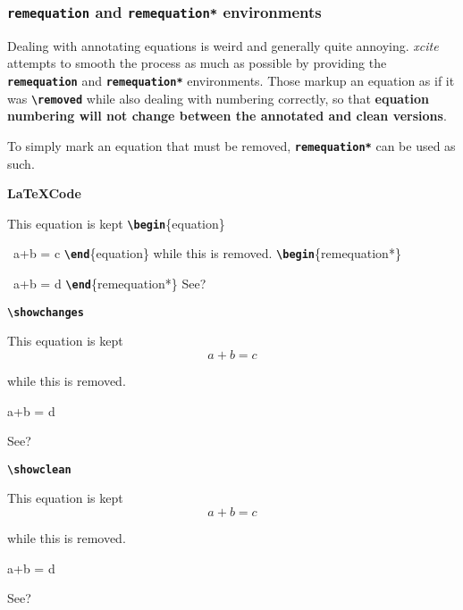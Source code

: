 \documentclass[a4paper]{ltxdoc}
\newcommand{\writecommand}[1]{\texttt{\textbf{{\textbackslash#1}}}}
\newcommand{\writeenv}[1]{\texttt{\textbf{{#1}}}}
\newcommand{\writearg}[1]{\{#1\}}
\begin{document}
\subsubsection{\writeenv{remequation} and \writeenv{remequation*} environments}

Dealing with annotating equations is weird and generally quite annoying.
\textit{xcite} attempts to smooth the process as much as possible by providing the \writeenv{remequation} and \writeenv{remequation*} environments.
Those markup an equation as if it was \writecommand{removed} while also dealing with numbering correctly, so that \textbf{equation numbering will not change between the annotated and clean versions}.

To simply mark an equation that must be removed, \writeenv{remequation*} can be used as such.

\begin{center}
    \begin{minipage}[t]{0.3\linewidth}
    \textbf{\LaTeX Code}
    
    This equation is kept \newline
    \writecommand{begin}\writearg{equation}

    ~\quad a+b = c\newline
    \writecommand{end}\writearg{equation}\newline
    while this is removed.\newline
    \writecommand{begin}\writearg{remequation*}

    ~\quad a+b = d\newline
    \writecommand{end}\writearg{remequation*}\newline
    See?
    
    \end{minipage}
    \hfill
    \begin{minipage}[t]{0.3\linewidth}
    \writecommand{showchanges}
    \showchanges
    
    This equation is kept
    \begin{equation}
        a+b = c
    \end{equation}\addtocounter{equation}{-1}
    while this is removed.
    \begin{remequation*}
        a+b = d
    \end{remequation*}
    See?
    
    \end{minipage}
    \hfill
    \begin{minipage}[t]{0.3\linewidth}   
    \writecommand{showclean}
    \showclean
    
    This equation is kept
    \begin{equation}
        a+b = c
    \end{equation}\addtocounter{equation}{-1}
    while this is removed.
    \begin{remequation*}
        a+b = d
    \end{remequation*}
    See?

\end{minipage}
\end{center}
\showchanges
\end{document}
